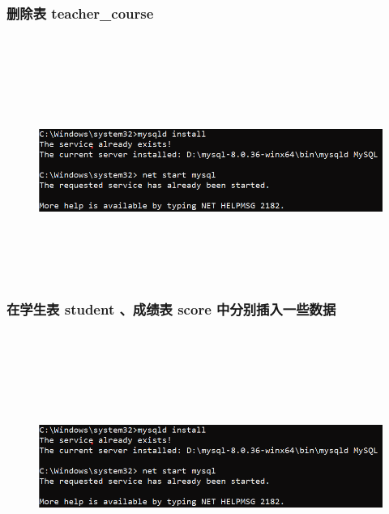 \documentclass{ctexart}
\begin{document}
\subsubsection{删除表 teacher\_course}
\begin{lstlisting}[language=sql]
	
\end{lstlisting}
\begin{figure}[H]
	\centering 
	\includegraphics[height=7cm,width=14cm]{1.png}
	\end{figure}
\subsubsection{在学生表 student 、成绩表 score 中分别插入一些数据}
\begin{lstlisting}[language=sql]
	
\end{lstlisting}
\begin{figure}[H]
	\centering 
	\includegraphics[height=7cm,width=14cm]{1.png}
	\end{figure}
\end{document}
